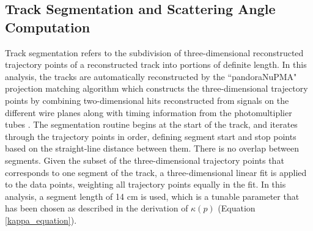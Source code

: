 \documentclass[a4paper,11pt]{article}
\begin{document}
\subsection{Track Segmentation and Scattering Angle Computation}\label{track_segmentation_and_scattering_angle_computation_section}

Track segmentation refers to the subdivision of three-dimensional reconstructed trajectory points of a reconstructed track into portions of definite length. In this analysis, the tracks are automatically reconstructed by the ``pandoraNuPMA" projection matching algorithm which constructs the three-dimensional trajectory points by combining two-dimensional hits reconstructed from signals on the different wire planes along with timing information from the photomultiplier tubes \cite{Marshall:2015rfa}. The segmentation routine begins at the start of the track, and iterates through the trajectory points in order, defining segment start and stop points based on the straight-line distance between them. There is no overlap between segments. Given the subset of the three-dimensional trajectory points that corresponds to one segment of the track, a three-dimensional linear fit is applied to the data points, weighting all trajectory points equally in the fit. In this analysis, a segment length of 14 cm is used, which is a tunable parameter that has been chosen as described in the derivation of $\kappa(p)$ (Equation \ref{kappa_equation}).\\
\end{document}
